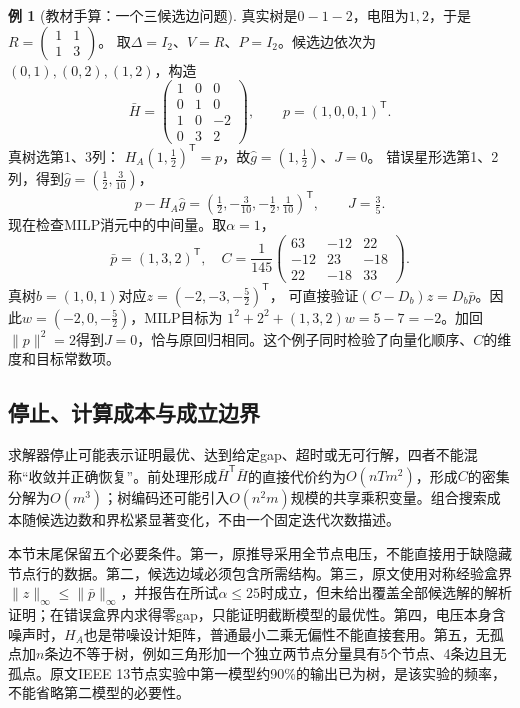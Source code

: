 \documentclass[UTF8,11pt,fontset=fandol,openany,oneside]{ctexbook}
\theoremstyle{definition}
\newtheorem{example}[theorem]{例}
\theoremstyle{remark}
\numberwithin{equation}{chapter}
\begin{document}
\begin{example}[教材手算：一个三候选边问题]
真实树是$0-1-2$，电阻为$1,2$，于是
$R=\left(\begin{smallmatrix}1&1\\1&3\end{smallmatrix}\right)$。
取$\Delta=I_2$、$V=R$、$P=I_2$。候选边依次为$(0,1),(0,2),(1,2)$，构造
\[
 \bar H=
 \begin{pmatrix}1&0&0\\0&1&0\\1&0&-2\\0&3&2\end{pmatrix},
 \qquad p=(1,0,0,1)^{\mathsf T}.
\]
真树选第1、3列：
$H_A(1,\tfrac12)^{\mathsf T}=p$，故$\widehat g=(1,\tfrac12)$、$J=0$。
错误星形选第1、2列，得到$\widehat g=(\tfrac12,\tfrac3{10})$，
\[
 p-H_A\widehat g=(\tfrac12,-\tfrac3{10},-\tfrac12,\tfrac1{10})^{\mathsf T},
 \qquad J=\tfrac35.
\]
现在检查MILP消元中的中间量。取$\alpha=1$，
\[
 \bar p=(1,3,2)^{\mathsf T},\quad
 C=\frac1{145}\begin{pmatrix}
 63&-12&22\\-12&23&-18\\22&-18&33
 \end{pmatrix}.
\]
真树$b=(1,0,1)$对应$z=(-2,-3,-\tfrac52)^{\mathsf T}$，
可直接验证$(C-D_b)z=D_b\bar p$。因此$w=(-2,0,-\tfrac52)$，MILP目标为
$1^2+2^2+(1,3,2)w=5-7=-2$。加回$\|p\|^2=2$得到$J=0$，恰与原回归相同。这个例子同时检验了向量化顺序、$C$的维度和目标常数项。
\end{example}

\subsection{停止、计算成本与成立边界}

求解器停止可能表示证明最优、达到给定gap、超时或无可行解，四者不能混称“收敛并正确恢复”。前处理形成$\bar H^{\mathsf T}\bar H$的直接代价约为$O(nTm^2)$，形成$C$的密集分解为$O(m^3)$；树编码还可能引入$O(n^2m)$规模的共享乘积变量。组合搜索成本随候选边数和界松紧显著变化，不由一个固定迭代次数描述。

本节末尾保留五个必要条件。第一，原推导采用全节点电压，不能直接用于缺隐藏节点行的数据。第二，候选边域必须包含所需结构。第三，原文使用对称经验盒界$\|z\|_\infty\leq\|\bar p\|_\infty$，并报告在所试$\alpha\leq25$时成立，但未给出覆盖全部候选解的解析证明；在错误盒界内求得零gap，只能证明截断模型的最优性。第四，电压本身含噪声时，$H_A$也是带噪设计矩阵，普通最小二乘无偏性不能直接套用。第五，无孤点加$n$条边不等于树，例如三角形加一个独立两节点分量具有5个节点、4条边且无孤点。原文IEEE 13节点实验中第一模型约90\%的输出已为树，是该实验的频率，不能省略第二模型的必要性。
\end{document}
